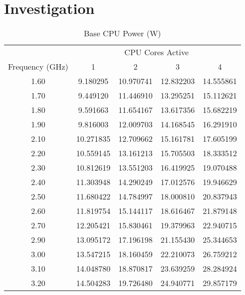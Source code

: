 \section{Investigation}


\begin{table}
\centering
\begin{tabular}{@{}ccccc@{}} \toprule
&\multicolumn{4}{c}{CPU Cores Active} \\ \cmidrule(r){2-5}
Frequency (GHz) & 1 & 2 & 3 & 4 \\ \midrule 
1.60 & 9.180295 & 10.970741 & 12.832203 & 14.555861 \\ 
1.70 & 9.449120 & 11.446910 & 13.295251 & 15.112621 \\ 
1.80 & 9.591663 & 11.654167 & 13.617356 & 15.682219 \\ 
1.90 & 9.816003 & 12.009703 & 14.168545 & 16.291910 \\ 
2.10 & 10.271835 & 12.709662 & 15.161781 & 17.605199 \\ 
2.20 & 10.559145 & 13.161213 & 15.705503 & 18.333512 \\ 
2.30 & 10.812619 & 13.551203 & 16.419925 & 19.070488 \\ 
2.40 & 11.303948 & 14.290249 & 17.012576 & 19.946629 \\ 
2.50 & 11.680422 & 14.784997 & 18.000810 & 20.837943 \\ 
2.60 & 11.819754 & 15.144117 & 18.616467 & 21.879148 \\ 
2.70 & 12.205421 & 15.830461 & 19.379963 & 22.940715 \\ 
2.90 & 13.095172 & 17.196198 & 21.155430 & 25.344653 \\ 
3.00 & 13.547215 & 18.160459 & 22.210073 & 26.759212 \\ 
3.10 & 14.048780 & 18.870817 & 23.639259 & 28.284924 \\ 
3.20 & 14.504283 & 19.726480 & 24.940771 & 29.857179 \\ 

\bottomrule
\end{tabular}
\caption{Base CPU Power (W)}
\end{table} 

